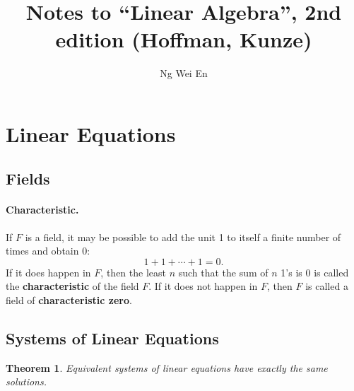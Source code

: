 \documentclass{article}
\title{Notes to ``Linear Algebra'', 2nd edition (Hoffman, Kunze)}
\author{Ng Wei En}
\newtheorem{theorem}{Theorem}
\begin{document}
\maketitle
\tableofcontents
\newpage

\section{Linear Equations}

\subsection{Fields}

\paragraph{Characteristic.} If $F$ is a field, it may be possible to add the
unit 1 to itself a finite number of times and obtain 0: \[
  1 + 1 + \cdots + 1 = 0.
\] If it does happen in $F$, then the least $n$ such that the sum of $n$ 1's is
0 is called the \textbf{characteristic} of the field $F$. If it does not happen
in $F$, then $F$ is called a field of \textbf{characteristic zero}.

\subsection{Systems of Linear Equations}

\begin{theorem}
  Equivalent systems of linear equations have exactly the same solutions.
\end{theorem}
\end{document}
